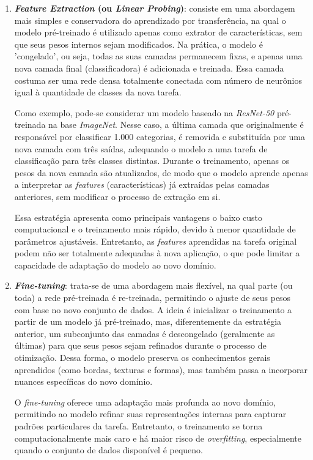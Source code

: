 \begin{enumerate}

    \item \textbf{\textit{Feature Extraction} (ou \textit{Linear Probing})}: consiste em uma abordagem mais simples e conservadora do aprendizado por transferência, na qual o modelo pré-treinado é utilizado apenas como extrator de características, sem que seus pesos internos sejam modificados. Na prática, o modelo é 'congelado', ou seja, todas as suas camadas permanecem fixas, e apenas uma nova camada final (classificadora) é adicionada e treinada. Essa camada costuma ser uma rede densa totalmente conectada com número de neurônios igual à quantidade de classes da nova tarefa.

    Como exemplo, pode-se considerar um modelo baseado na \textit{ResNet-50} pré-treinada na base \textit{ImageNet}. Nesse caso, a última camada que originalmente é responsável por classificar 1.000 categorias, é removida e substituída por uma nova camada com três saídas, adequando o modelo a uma tarefa de classificação para três classes distintas. Durante o treinamento, apenas os pesos da nova camada são atualizados, de modo que o modelo aprende apenas a interpretar as \textit{features} (características) já extraídas pelas camadas anteriores, sem modificar o processo de extração em si.

    Essa estratégia apresenta como principais vantagens o baixo custo computacional e o treinamento mais rápido, devido à menor quantidade de parâmetros ajustáveis. Entretanto, as \textit{features} aprendidas na tarefa original podem não ser totalmente adequadas à nova aplicação, o que pode limitar a capacidade de adaptação do modelo ao novo domínio.

    \item \textbf{\textit{Fine-tuning}}: trata-se de uma abordagem mais flexível, na qual parte (ou toda) a rede pré-treinada é re-treinada, permitindo o ajuste de seus pesos com base no novo conjunto de dados. A ideia é inicializar o treinamento a partir de um modelo já pré-treinado, mas, diferentemente da estratégia anterior, um subconjunto das camadas é descongelado (geralmente as últimas) para que seus pesos sejam refinados durante o processo de otimização. Dessa forma, o modelo preserva os conhecimentos gerais aprendidos (como bordas, texturas e formas), mas também passa a incorporar nuances específicas do novo domínio.

    O \textit{fine-tuning} oferece uma adaptação mais profunda ao novo domínio, permitindo ao modelo refinar suas representações internas para capturar padrões particulares da tarefa. Entretanto, o treinamento se torna computacionalmente mais caro e há maior risco de \textit{overfitting}, especialmente quando o conjunto de dados disponível é pequeno.
   
\end{enumerate}


